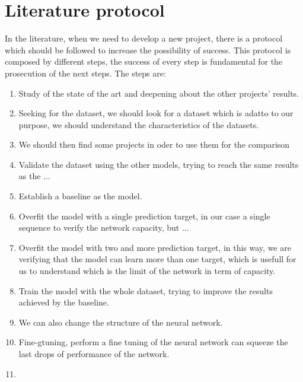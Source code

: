 \section{Literature protocol}\label{sec:literature-protocol}

In the literature, when we need to develop a new project, there is a protocol which should be followed to increase the possibility of success.
This protocol is composed by different steps, the success of every step is fundamental for the prosecution of the next steps.
The steps are:
\begin{enumerate}
    \item Study of the state of the art and deepening about the other projects' results.
    \item Seeking for the dataset, we should look for a dataset which is adatto to our purpose, we should understand the characteristics of the datasets.
    \item We should then find some projects in oder to use them for the comparison
    \item Validate the dataset using the other models, trying to reach the same results as the ...
    \item Establish a baseline as the model.
    \item Overfit the model with a single prediction target, in our case a single sequence to verify the network capacity, but ...
    \item Overfit the model with two and more prediction target, in this way, we are verifying that the model can learn more than one target, which is usefull for us to understand which is the limit of the network in term of capacity.
    \item Train the model with the whole dataset, trying to improve the results achieved by the baseline.
    \item We can also change the structure of the neural network.
    \item Fine-gtuning, perform a fine tuning of the neural network can squeeze the last drops of performance of the network.
    \item
\end{enumerate}